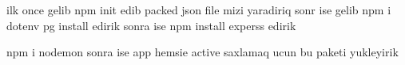 ilk once gelib npm init edib packed json file mizi yaradiriq
sonr ise gelib npm i dotenv pg install edirik
sonra ise npm install experss edirik

npm i nodemon sonra ise app  hemsie active saxlamaq 
ucun bu paketi yukleyirik